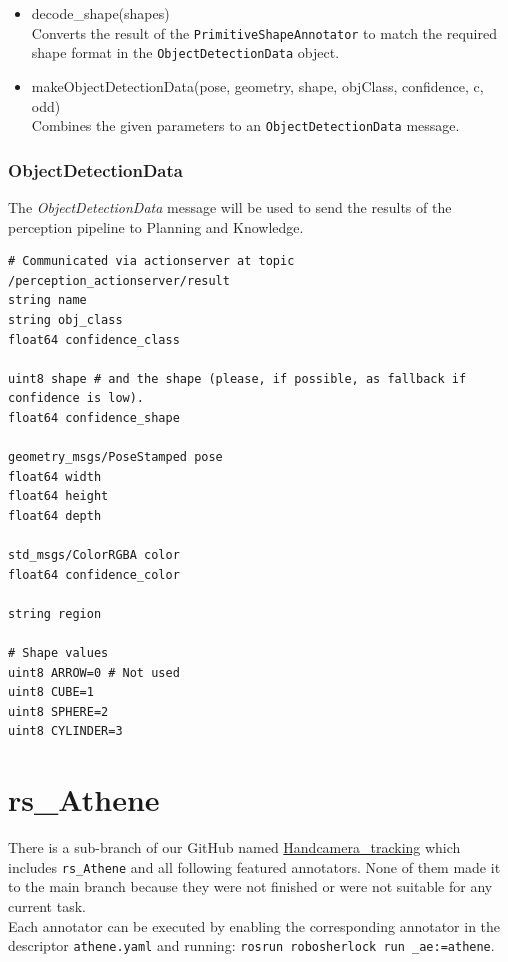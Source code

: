\documentclass[main.tex]{subfiles}
\begin{document}
\begin{itemize}
\item decode\_shape(shapes)\\
Converts the result of the \texttt{PrimitiveShapeAnnotator} to match the required shape format in the \texttt{ObjectDetectionData} object.

\item makeObjectDetectionData(pose, geometry, shape, objClass, confidence, c, odd)\\
Combines the given parameters to an \texttt{ObjectDetectionData} message.
\end{itemize}

\subsubsection{ObjectDetectionData}
The \textit{ObjectDetectionData} message will be used to send the results of the perception pipeline to Planning and Knowledge.

\begin{lstlisting}
# Communicated via actionserver at topic /perception_actionserver/result
string name
string obj_class
float64 confidence_class

uint8 shape # and the shape (please, if possible, as fallback if confidence is low). 
float64 confidence_shape

geometry_msgs/PoseStamped pose
float64 width
float64 height
float64 depth

std_msgs/ColorRGBA color
float64 confidence_color

string region

# Shape values
uint8 ARROW=0 # Not used
uint8 CUBE=1
uint8 SPHERE=2
uint8 CYLINDER=3
\end{lstlisting}

			\section{rs\_Athene}
There is a sub-branch of our GitHub named \href{https://github.com/SUTURO/suturo_perception/tree/Handcamera_tracking}{Handcamera\_tracking}
which includes \texttt{rs\_Athene} and all following featured annotators. 
None of them made it to the main branch because they were not finished or were not suitable for any current task. \\
Each annotator can be executed by enabling the corresponding annotator in the descriptor \texttt{athene.yaml} and running: \texttt{rosrun robosherlock run \_ae:=athene}. 
\end{document}
